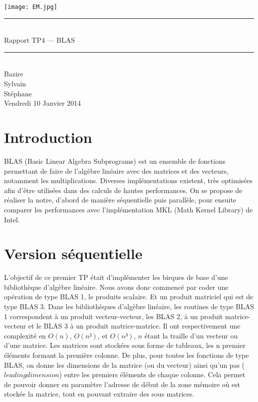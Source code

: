 \documentclass[a4paper,11pt]{article}
\begin{document}
\begin{titlepage}
  \begin{center}

    \begin{center}
      \texttt{[image: EM.jpg]}
    \end{center}

    \vspace*{1cm}
        
    \rule{0.75\linewidth}{0.7mm}\\[0.4cm]
    {\Huge Rapport TP4 --- BLAS\\[0.4cm]}
    \rule{0.75\linewidth}{0.7mm} \\[1.5cm]

    {\Large Bazire \\Sylvain {}\\Stéphane \\[2cm]}
    {\Large Vendredi 10 Janvier 2014}
  \end{center}
\end{titlepage}

\tableofcontents
\clearpage
\section{Introduction}

BLAS (Basic Linear Algebra Subprograms) est un ensemble de fonctions permettant de faire de l'algèbre linéaire avec des matrices et des vecteurs, notamment les multiplications. Diverses implémentations existent, très optimisées afin d'être utilisées dans des calculs de hautes performances. On se propose de réaliser la notre, d'abord de manière séquentielle puis parallèle, pour ensuite comparer les performances avec l'implémentation MKL (Math Kernel Library) de Intel.

\section{Version séquentielle}
L'objectif de ce premier TP était d'implémenter les birques de base d'une bibliothèque d'algèbre linéaire. Nous avons donc commencé par coder une opération de type BLAS 1, le produits scalaire. Et un produit matriciel qui est de type BLAS 3.
Dans les bibliothèques d'algèbre linéaire, les routines de type BLAS 1 correspondent à un produit vecteur-vecteur, les BLAS 2, à un produit matrice-vecteur et le BLAS 3 à un produit matrice-matrice. Il ont respectivement une complexité en $O(n)$, $O(n²)$, et $O(n³)$, $n$ étant la traille d'un vecteur ou d'une matrice.
Les matrices sont stockées sous forme de tableaux, les n premier éléments formant la première colonne. De plus, pour toutes les fonctions de type BLAS, on donne les dimensions de la matrice (ou du vecteur) ainsi qu'un pas ($leading dimension$) entre les premiers éléments de chaque colonne. Cela permet de pouvoir donner en paramètre l'adresse de début de la zone mémoire où est stockée la matrice, tout en pouvant extraire des sous matrices.
\end{document}
